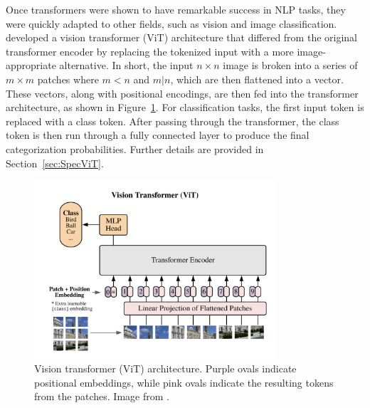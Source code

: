 Once transformers were shown to have remarkable success in NLP tasks, they were 
quickly adapted to other fields, such as vision and image classification.
\textcite{dosovitskiy2020} developed a vision transformer (ViT) architecture 
that differed from the original transformer encoder by replacing the tokenized 
input with a more image-appropriate alternative. In short, 
the input $n\times n$ image is broken into a series of $m\times m$ patches where 
$m<n$ and $m|n$, which are then flattened into
a vector. These vectors, along with positional encodings, are then fed into the
transformer architecture, as shown in Figure~\ref{fig:ViT_orig}. For classification tasks, the first input token is 
replaced with a class token. After passing through the transformer, the class token 
is then run through a fully connected layer to produce the final categorization probabilities. 
Further details are provided in Section~\ref{sec:SpecViT}. 

\begin{figure}[t]
    \centering
    \includegraphics[width=0.8\textwidth]{figures/transformer_paper/ViT_Original.png}
    \caption[ViT Architecture]{Vision transformer (ViT) architecture. Purple ovals indicate 
        positional embeddings, while pink ovals indicate the resulting tokens from 
        the patches. Image from \textcite{dosovitskiy2020}.
    \label{fig:ViT_orig}}
\end{figure}

